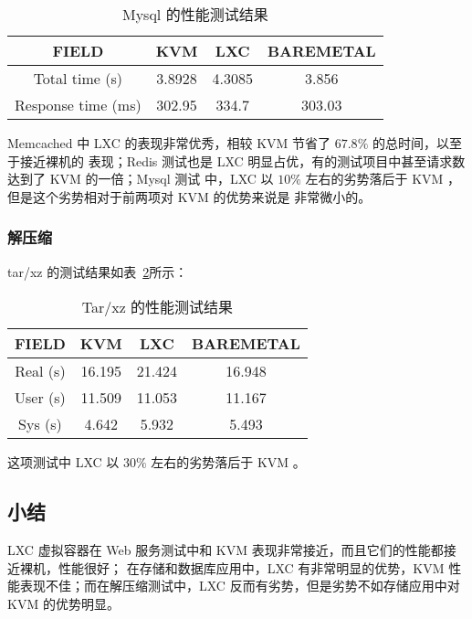 \begin{table}[H]
    \centering
    \caption{Mysql 的性能测试结果}
    \begin{tabular}{||c c c c||}
        \hline
        FIELD & KVM & LXC & BAREMETAL \\
        \hline
        \hline
        Total time (s) & 3.8928 & 4.3085 & 3.856 \\
        \hline
        Response time (ms) & 302.95 & 334.7 & 303.03 \\
        \hline
    \end{tabular}
    \label{tab:mysql-perf}
\end{table}

Memcached 中 LXC 的表现非常优秀，相较 KVM 节省了 $67.8\%$ 的总时间，以至于接近裸机的
表现；Redis 测试也是 LXC 明显占优，有的测试项目中甚至请求数达到了 KVM 的一倍；Mysql 测试
中，LXC 以 $10\%$ 左右的劣势落后于 KVM ，但是这个劣势相对于前两项对 KVM 的优势来说是
非常微小的。

\subsubsection{解压缩}

tar/xz 的测试结果如表~\ref{tab:tar-xz-perf}所示：

\begin{table}[H]
    \centering
    \caption{Tar/xz 的性能测试结果}
    \begin{tabular}{||c c c c||}
        \hline
        FIELD & KVM & LXC & BAREMETAL \\
        \hline
        \hline
        Real (s) & 16.195 & 21.424 & 16.948 \\
        \hline
        User (s) & 11.509 & 11.053 & 11.167 \\
        \hline
        Sys (s) & 4.642 & 5.932 & 5.493 \\
        \hline
    \end{tabular}
    \label{tab:tar-xz-perf}
\end{table}

这项测试中 LXC 以 $30\%$ 左右的劣势落后于 KVM 。

\subsection{小结}

LXC 虚拟容器在 Web 服务测试中和 KVM 表现非常接近，而且它们的性能都接近裸机，性能很好；
在存储和数据库应用中，LXC 有非常明显的优势，KVM 性能表现不佳；而在解压缩测试中，LXC
反而有劣势，但是劣势不如存储应用中对 KVM 的优势明显。

